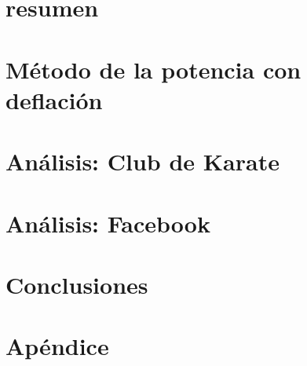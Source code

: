 

 



\section*{resumen}

\vspace{2em}

\tableofcontents
\newpage

\section{Método de la potencia con deflación}

\newpage

\section{Análisis: Club de Karate}

\newpage

\section{Análisis: Facebook}

\newpage

\section{Conclusiones}

\newpage

\section{Apéndice}

\newpage

%
%

